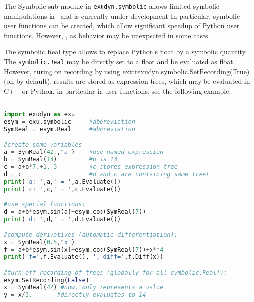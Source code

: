\label{sec:cinterface:symbolic}
The Symbolic sub-module in \texttt{exudyn.symbolic} allows limited symbolic manipulations in \codeName\ and is currently under development In particular, symbolic user functions can be created, which allow significant speedup of Python user functions. However, , as behavior may be unexpected in some cases. 




The symbolic Real type allows to replace Python's float by a symbolic quantity. The \texttt{symbolic.Real} may be directly set to a float and be evaluated as float. However, turing on recording by using 	exttt{exudyn.symbolic.SetRecording(True)} (on by default), results are stored as expression trees, which may be evaluated in C++ or Python, in particular in user functions, see the following example:
\pythonstyle
\begin{lstlisting}[language=Python, firstnumber=1]

import exudyn as exu
esym = exu.symbolic     #abbreviation
SymReal = esym.Real     #abbreviation

#create some variables
a = SymReal(42.,"a")    #use named expression
b = SymReal(13)         #b is 13
c = a+b*7.+1.-3         #c stores expression tree
d = c                   #d and c are containing same tree!
print('a: ',a,' = ',a.Evaluate())
print('c: ',c,' = ',c.Evaluate())

#use special functions:
d = a+b*esym.sin(a)+esym.cos(SymReal(7))
print('d: ',d,' = ',d.Evaluate())

#compute derivatives (automatic differentiation):
x = SymReal(0.5,"x")
f = a+b*esym.sin(x)+esym.cos(SymReal(7))+x**4
print('f=',f.Evaluate(), ', diff=',f.Diff(x))

#turn off recording of trees (globally for all symbolic.Real!):
esym.SetRecording(False)
x = SymReal(42) #now, only represents a value
y = x/3.       #directly evaluates to 14
\end{lstlisting}


